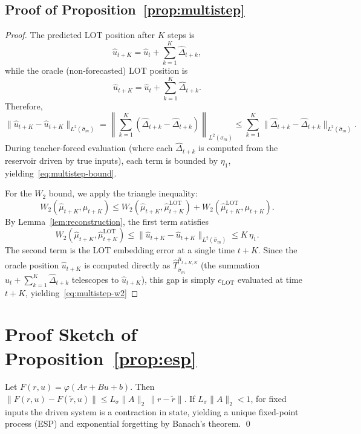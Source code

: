\documentclass[11pt]{article}
\newcommand{\1}{\mathbf{1}}
\begin{document}
\subsection{Proof of Proposition~\ref{prop:multistep}}
\label{app:proof-multistep}
\begin{proof}
The predicted LOT position after $K$ steps is
\[
  \widehat{u}_{t+K}
  = \hat{u}_t + \sum_{k=1}^{K} \widehat{\Delta}_{t+k},
\]
while the oracle (non-forecasted) LOT position is
\[
  \hat{u}_{t+K} = \hat{u}_t + \sum_{k=1}^{K} \hat{\Delta}_{t+k}.
\]
Therefore,
\begin{equation}\label{eq:position-error-sum}
  \|\widehat{u}_{t+K} - \hat{u}_{t+K}\|_{L^2(\hat{\sigma}_m)}
  = \left\|\sum_{k=1}^{K}
    (\widehat{\Delta}_{t+k} - \hat{\Delta}_{t+k})
    \right\|_{L^2(\hat{\sigma}_m)}
  \leq \sum_{k=1}^{K}
    \|\widehat{\Delta}_{t+k}
    - \hat{\Delta}_{t+k}\|_{L^2(\hat{\sigma}_m)}.
\end{equation}
During teacher-forced evaluation (where each $\widehat{\Delta}_{t+k}$ is
computed from the reservoir driven by true inputs), each term is bounded by
$\eta_1$, yielding~\eqref{eq:multistep-bound}.

For the $W_2$ bound, we apply the triangle inequality:
\[
  W_2(\widehat{\mu}_{t+K}, \mu_{t+K})
  \leq W_2(\widehat{\mu}_{t+K}, \hat{\mu}_{t+K}^{\mathrm{LOT}})
  + W_2(\hat{\mu}_{t+K}^{\mathrm{LOT}}, \mu_{t+K}).
\]
By Lemma~\ref{lem:reconstruction}, the first term satisfies
\[
  W_2(\widehat{\mu}_{t+K}, \hat{\mu}_{t+K}^{\mathrm{LOT}})
  \leq \|\widehat{u}_{t+K} - \hat{u}_{t+K}\|_{L^2(\hat{\sigma}_m)}
  \leq K\,\eta_1.
\]
The second term is the LOT embedding error at a single time $t+K$. Since the oracle position $\hat{u}_{t+K}$ is computed directly as $\hat{T}_{\hat{\sigma}_m}^{\hat{\mu}_{t+K,N}}$ (the summation $\hat{u}_t + \sum_{k=1}^K \hat{\Delta}_{t+k}$ telescopes to $\hat{u}_{t+K}$), this gap is simply $e_{\mathrm{LOT}}$ evaluated at time $t+K$, yielding~\eqref{eq:multistep-w2}
\end{proof}

\section{Proof Sketch of Proposition~\ref{prop:esp}}
\label{app:proof-esp}
Let \(F(r,u)=\varphi(Ar+Bu+b)\). Then
\(
\|F(r,u)-F(\tilde r,u)\|
\le L_\sigma\|A\|_2\,\|r-\tilde r\|.
\)
If \(L_\sigma\|A\|_2<1\), for fixed inputs the driven system is a contraction in state, yielding a unique fixed-point process (ESP) and exponential forgetting by Banach’s theorem.
\qed
\end{document}

